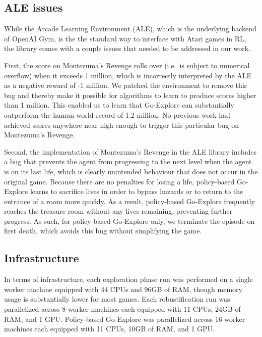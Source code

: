 \documentclass{nature}
\renewcommand*{\cite}[1]{\supercite{#1}}
\begin{document}
\subsection{ALE issues}
\label{sec:ale_issues}

While the Arcade Learning Environment (ALE)\cite{bellemare2013arcade}, which is the underlying backend of OpenAI Gym, is the the standard way to interface with Atari games in RL, the library comes with a couple issues that needed to be addressed in our work.

First, the score on Montezuma's Revenge rolls over (i.e.\ is subject to numerical overflow) when it exceeds 1 million, which is incorrectly interpreted by the ALE as a negative reward of -1 million.
We patched the environment to remove this bug and thereby make it possible for algorithms to learn to produce scores higher than 1 million. This enabled us to learn that Go-Explore can substantially outperform the human world record of 1.2 million\cite{atari_scoreboard}.
No previous work had achieved scores anywhere near high enough to trigger this particular bug on Montezuma's Revenge.

Second, the implementation of Montezuma's Revenge in the ALE library includes a bug that prevents the agent from progressing to the next level when the agent is on its last life, which is clearly unintended behaviour that does not occur in the original game.
Because there are no penalties for losing a life, policy-based Go-Explore learns to sacrifice lives in order to bypass hazards or to return to the entrance of a room more quickly.
As a result, policy-based Go-Explore frequently reaches the treasure room without any lives remaining, preventing further progress.
As such, for policy-based Go-Explore only, we terminate the episode on first death, which avoids this bug without simplifying the game.


\subsection{Infrastructure}

In terms of infrastructure, each exploration phase run was performed on a single worker machine equipped with 44 CPUs and 96GB of RAM, though memory usage is substantially lower for most games. Each robustification run was parallelized across 8 worker machines each equipped with 11 CPUs, 24GB of RAM, and 1 GPU. 
Policy-based Go-Explore was parallelized across 16 worker machines each equipped with 11 CPUs, 10GB of RAM, and 1 GPU.

\FloatBarrier

\printbibliography[segment=3,check=onlynew]
\end{document}
